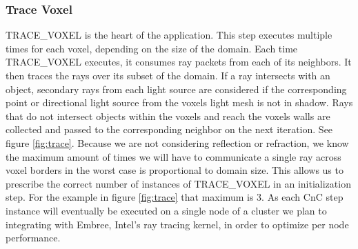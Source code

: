 \subsubsection{Trace Voxel}

TRACE\_VOXEL is the heart of the application. This step executes multiple times for each voxel, depending on the size of the domain.  Each time TRACE\_VOXEL executes, it consumes ray packets from each of its neighbors. It then traces the rays over its subset of the domain. If a ray intersects with an object, secondary rays from each light source are considered if the corresponding point or directional light source from the voxels light mesh is not in shadow. Rays that do not intersect objects within the voxels and reach the voxels walls are collected and passed to the corresponding neighbor on the next iteration. See figure \ref{fig:trace}.  Because we are not considering reflection or refraction, we know the maximum amount of times we will have to communicate a single ray across voxel borders in the worst case is proportional to domain size.  This allows us to prescribe the correct number of instances of TRACE\_VOXEL in an initialization step.  For the example in figure \ref{fig:trace} that maximum is 3.  As each CnC step instance will eventually be executed on a single node of a cluster we plan to integrating with Embree, Intel’s ray tracing kernel, in order to optimize per node performance.

